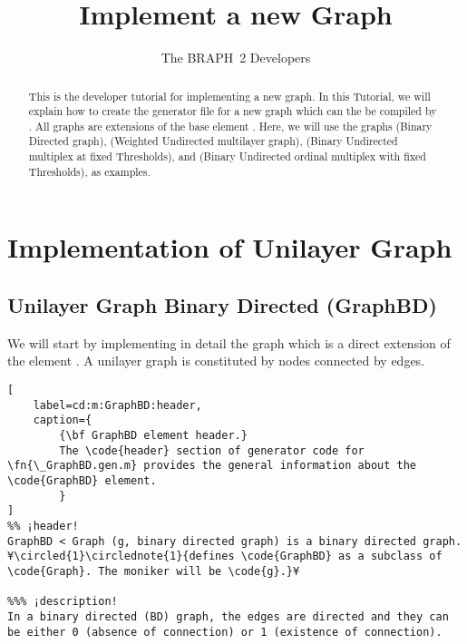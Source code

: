 \documentclass{tufte-handout}
\title{Implement a new Graph}
\author[The BRAPH~2 Developers]{The BRAPH~2 Developers}
\begin{document}
\maketitle

\begin{abstract}
\noindent
This is the developer tutorial for implementing a new graph. 
In this Tutorial, we will explain how to create the generator file  for a new graph which can the be compiled by . All graphs are extensions of the base element . Here, we will use the graphs  (Binary Directed graph),  (Weighted Undirected multilayer graph),  (Binary Undirected multiplex at fixed Thresholds), and  (Binary Undirected ordinal multiplex with fixed Thresholds), as examples.
\end{abstract}

\tableofcontents

\clearpage
\section{Implementation of Unilayer Graph}

\subsection{Unilayer Graph Binary Directed (GraphBD)}

We will start by implementing in detail the graph  which  is a direct extension of the element .
A unilayer graph is constituted by nodes connected by edges.

\begin{lstlisting}[
	label=cd:m:GraphBD:header,
	caption={
		{\bf GraphBD element header.}
		The \code{header} section of generator code for \fn{\_GraphBD.gen.m} provides the general information about the \code{GraphBD} element.
		}
]
%% ¡header!
GraphBD < Graph (g, binary directed graph) is a binary directed graph. ¥\circled{1}\circlednote{1}{defines \code{GraphBD} as a subclass of \code{Graph}. The moniker will be \code{g}.}¥

%%% ¡description!
In a binary directed (BD) graph, the edges are directed and they can be either 0 (absence of connection) or 1 (existence of connection).
\end{lstlisting}
\end{document}
